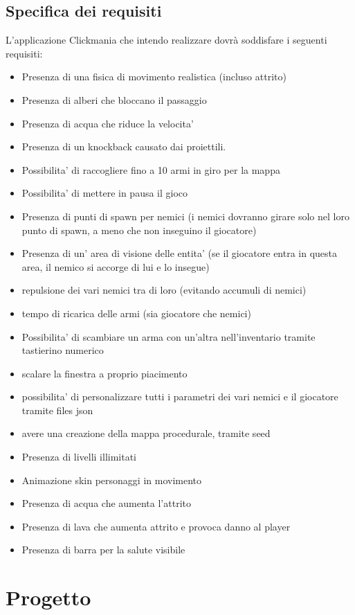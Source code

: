 \documentclass[12pt,a4paper]{report}
\begin{document}
\section{Specifica dei requisiti}\label{se:appjgal}
L’applicazione Clickmania che intendo realizzare dovrà soddisfare i seguenti requisiti:
\begin{itemize}
\item Presenza di una fisica di movimento realistica (incluso attrito)
\item Presenza di alberi che bloccano il passaggio
\item Presenza di acqua che riduce la velocita'
\item Presenza di un knockback causato dai proiettili.
\item Possibilita' di raccogliere fino a 10 armi in giro per la mappa
\item Possibilita' di mettere in pausa il gioco
\item Presenza di punti di spawn per nemici (i nemici dovranno girare solo nel loro punto di spawn, a meno che non inseguino il giocatore)
\item Presenza di un' area di visione delle entita' (se il giocatore entra in questa area, il nemico si accorge di lui e lo insegue)
\item repulsione dei vari nemici tra di loro (evitando accumuli di nemici)
\item tempo di ricarica delle armi (sia giocatore che nemici)
\item Possibilita' di scambiare un arma con un'altra nell'inventario tramite tastierino numerico
\item scalare la finestra a proprio piacimento
\item possibilita' di  personalizzare tutti i parametri dei vari nemici e il giocatore tramite files json
\item avere una creazione della mappa procedurale, tramite seed
\item Presenza di livelli illimitati
\item Animazione skin personaggi in movimento
\item Presenza di acqua che aumenta l'attrito
\item Presenza di lava che aumenta attrito e provoca danno al player
\item Presenza di barra per la salute visibile
\end{itemize}
\newpage

\chapter{Progetto}\label{ch:spereq}
\end{document}
